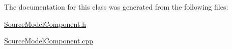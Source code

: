 The documentation for this class was generated from the following files\-:\begin{DoxyCompactItemize}
\item 
\hyperlink{_source_model_component_8h}{Source\-Model\-Component.\-h}\item 
\hyperlink{_source_model_component_8cpp}{Source\-Model\-Component.\-cpp}\end{DoxyCompactItemize}
